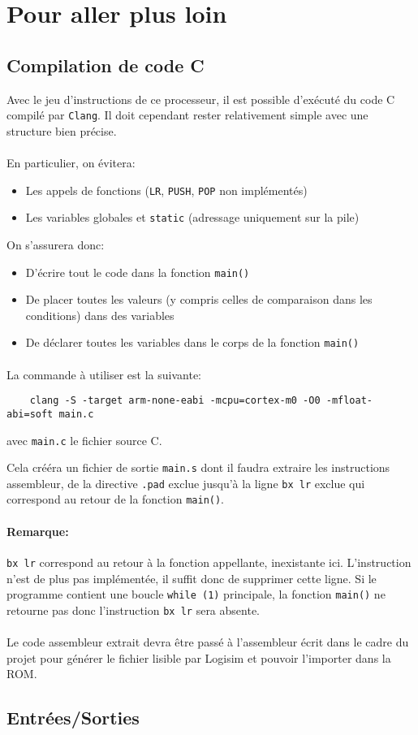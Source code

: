\section{Pour aller plus loin}
\subsection{Compilation de code C}
Avec le jeu d'instructions de ce processeur, il est possible d'exécuté du code C compilé par \texttt{Clang}.
Il doit cependant rester relativement simple avec une structure bien précise.

\paragraph{}
En particulier, on évitera:
\begin{itemize}
	\item Les appels de fonctions (\texttt{LR}, \texttt{PUSH}, \texttt{POP} non implémentés)
	\item Les variables globales et \texttt{static} (adressage uniquement sur la pile)
\end{itemize}

On s'assurera donc:
\begin{itemize}
	\item D'écrire tout le code dans la fonction \texttt{main()}
	\item De placer toutes les valeurs (y compris celles de comparaison dans les conditions) dans des variables
	\item De déclarer toutes les variables dans le corps de la fonction \texttt{main()}
\end{itemize}

\paragraph{}
La commande à utiliser est la suivante:
\begin{lstlisting}
	clang -S -target arm-none-eabi -mcpu=cortex-m0 -O0 -mfloat-abi=soft main.c
\end{lstlisting}
avec \texttt{main.c} le fichier source C.

Cela crééra un fichier de sortie \texttt{main.s} dont il faudra extraire les instructions assembleur, 
de la directive \texttt{.pad} exclue jusqu'à la ligne \texttt{bx lr} exclue qui correspond au retour de la fonction \texttt{main()}.

\paragraph{Remarque:} \texttt{bx lr} correspond au retour à la fonction appellante, inexistante ici.
L'instruction n'est de plus pas implémentée, il suffit donc de supprimer cette ligne.
Si le programme contient une boucle \texttt{while (1)} principale, la fonction \texttt{main()} ne retourne pas donc l'instruction \texttt{bx lr} sera absente.

\paragraph{}
Le code assembleur extrait devra être passé à l'assembleur écrit dans le cadre du projet pour générer le fichier lisible par Logisim et pouvoir l'importer dans la ROM.


\subsection{Entrées/Sorties}
